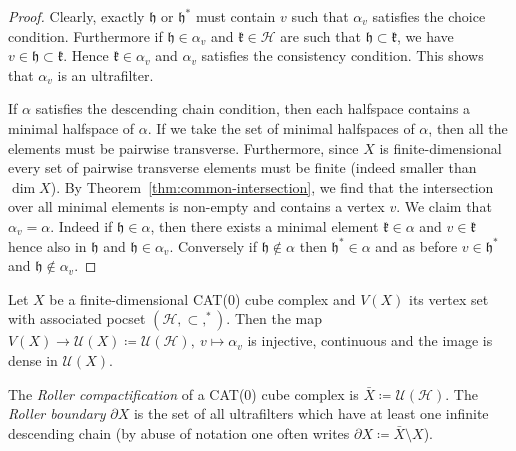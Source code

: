\begin{proof}
  Clearly, exactly \(\mathfrak{h}\) or \(\mathfrak{h}^\ast\) must contain \(v\) such that \(\alpha_v\) satisfies the choice condition. Furthermore if \(\mathfrak{h} \in \alpha_v\) and \(\mathfrak{k} \in \mathcal{H}\) are such that \(\mathfrak{h} \subset \mathfrak{k}\), we have \(v \in \mathfrak{h} \subset \mathfrak{k}\). Hence \(\mathfrak{k} \in \alpha_v\) and \(\alpha_v\) satisfies the consistency condition. This shows that \(\alpha_v\) is an ultrafilter.

    If \(\alpha\) satisfies the descending chain condition, then each halfspace contains a minimal halfspace of \(\alpha\). If we take the set of minimal halfspaces of \(\alpha\), then all the elements must be pairwise transverse. Furthermore, since \(X\) is finite-dimensional every set of pairwise transverse elements must be finite (indeed smaller than \(\dim X\)). By Theorem~\ref{thm:common-intersection}, we find that the intersection over all minimal elements is non-empty and contains a vertex \(v\). We claim that \(\alpha_v = \alpha\). Indeed if \(\mathfrak{h} \in \alpha\), then there exists a minimal element \(\mathfrak{k} \in \alpha\) and \(v \in \mathfrak{k}\) hence also in \(\mathfrak{h}\) and \(\mathfrak{h} \in \alpha_v\). Conversely if \(\mathfrak{h} \not \in \alpha\) then \(\mathfrak{h}^\ast \in \alpha\) and as before \(v \in \mathfrak{h}^\ast\) and \(\mathfrak{h} \not \in \alpha_v\).
\end{proof}

\begin{thm}
  \label{thm:roller-compactification}
  Let \(X\) be a finite-dimensional CAT(0) cube complex and \(V(X)\) its vertex set with associated pocset \((\mathcal{H}, \subset, ^\ast)\). Then the map \(V(X) \to \mathcal{U}(X) \coloneqq \mathcal{U}(\mathcal{H}),\ v \mapsto \alpha_v\) is injective, continuous and the image is dense in \(\mathcal{U}(X)\). 
\end{thm}

\begin{defin}
  The \emph{Roller compactification} of a CAT(0) cube complex is \(\bar X \coloneqq \mathcal{U}(\mathcal{H})\). The \emph{Roller boundary} \(\partial X\) is the set of all ultrafilters which have at least one infinite descending chain (by abuse of notation one often writes \(\partial X \coloneqq \bar X \setminus X\)).
\end{defin}

